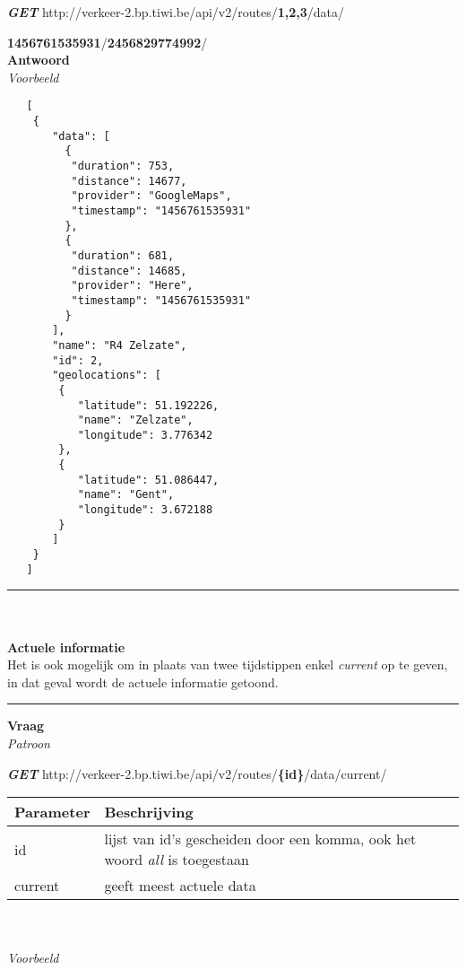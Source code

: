 \documentclass[ps,a4paper,oneside]{report}
\begin{document}
\textbf{\textit{GET}}
 http://verkeer-2.bp.tiwi.be/api/v2/routes/\textbf{1,2,3}/data/
 
 \textbf{1456761535931}/\textbf{2456829774992}/\\
 
\textbf{Antwoord}\\

\textit{Voorbeeld}
\begin{verbatim}
   [
    {
       "data": [
         {
          "duration": 753,
          "distance": 14677,
          "provider": "GoogleMaps",
          "timestamp": "1456761535931"
         },
         {
          "duration": 681,
          "distance": 14685,
          "provider": "Here",
          "timestamp": "1456761535931"
         }
       ],
       "name": "R4 Zelzate",
       "id": 2,
       "geolocations": [
        {
           "latitude": 51.192226,
           "name": "Zelzate",
           "longitude": 3.776342
        },
        {
           "latitude": 51.086447,
           "name": "Gent",
           "longitude": 3.672188
        }
       ]
    }
   ]\end{verbatim}
\noindent\rule[0.5ex]{\linewidth}{1pt}\\\\
\textbf{Actuele informatie}\\
Het is ook mogelijk om in plaats van twee tijdstippen enkel \textit{current} op te geven, in dat geval wordt de actuele informatie getoond.\\
\noindent\rule[0.5ex]{\linewidth}{1pt}
\textbf{Vraag}\\

\textit{Patroon}

\textbf{\textit{GET}}
http://verkeer-2.bp.tiwi.be/api/v2/routes/\textbf{\{id\}}/data/current/\\

\begin{tabular}{ | l | p{8.5cm}| }
	\hline
	\textbf{Parameter} & \textbf{Beschrijving}\\
	\hline
	id & lijst van id's gescheiden door een komma, ook het woord \textit{all} is toegestaan\\
	\hline
	current & geeft meest actuele data\\
	\hline
\end{tabular}\\\\

\textit{Voorbeeld}
\end{document}
